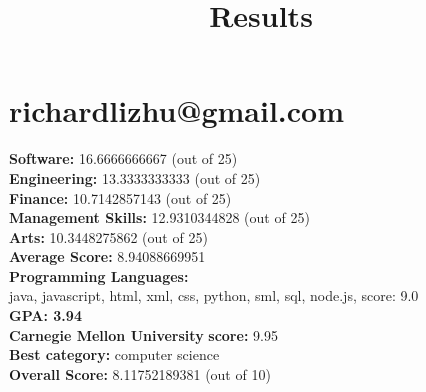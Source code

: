 \documentclass{article}
\title{Results}
\begin{document}
\section{richardlizhu@gmail.com}
\textbf{Software:} 16.6666666667 (out of 25)\\
\textbf{Engineering: } 13.3333333333 (out of 25)\\
\textbf{Finance:} 10.7142857143 (out of 25)\\
\textbf{Management Skills:} 12.9310344828 (out of 25)\\
\textbf{Arts:} 10.3448275862 (out of 25)\\
\textbf{Average Score: } 8.94088669951\\
\textbf{Programming Languages:} \\
java, javascript, html, xml, css, python, sml, sql, node.js, score: 9.0\\
\textbf{GPA: 3.94}\\
\textbf{Carnegie Mellon University} \textbf{score:} 9.95\\
\textbf{Best category: } computer science\\
\textbf{Overall Score: }8.11752189381 (out of 10)
\end{document}
